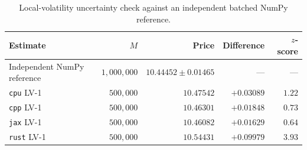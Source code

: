 \begin{table}[htbp]
\centering
\small
\caption{Local-volatility uncertainty check against an independent batched NumPy reference.}
\label{tab:localvol-uncertainty}
\begin{tabular}{lrrrr}
\toprule
\textbf{Estimate} &
\textbf{\(M\)} &
\textbf{Price} &
\textbf{Difference} &
\textbf{\(z\)-score} \\
\midrule
Independent NumPy reference & \(1{,}000{,}000\) & \(10.44452 \pm 0.01465\) & --- & --- \\
\texttt{cpu} LV-1 & \(500{,}000\) & \(10.47542\) & \(+0.03089\) & \(1.22\) \\
\texttt{cpp} LV-1 & \(500{,}000\) & \(10.46301\) & \(+0.01848\) & \(0.73\) \\
\texttt{jax} LV-1 & \(500{,}000\) & \(10.46082\) & \(+0.01629\) & \(0.64\) \\
\texttt{rust} LV-1 & \(500{,}000\) & \(10.54431\) & \(+0.09979\) & \(3.93\) \\
\bottomrule
\end{tabular}
\end{table}
